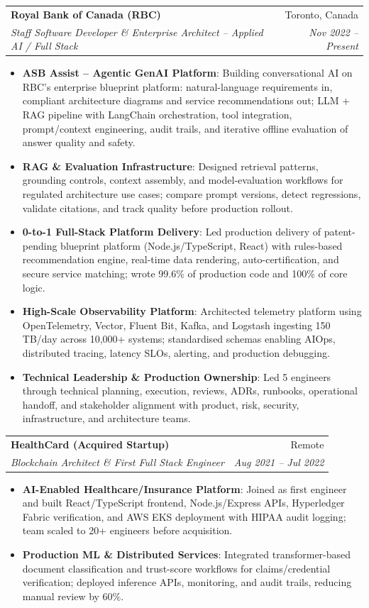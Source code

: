 \documentclass[letterpaper,9.5pt]{article}
\makeatletter
\newcommand{\resumeItem}[2]{\item\small{\textbf{#1}{: #2 \vspace{-2pt}}}}
\newcommand{\resumeSubheading}[4]{\vspace{-2pt}\item\begin{tabular*}{0.97\textwidth}{l@{\extracolsep{\fill}}r}\textbf{#1} & #2 \\\textit{\small#3} & \textit{\small #4} \\\end{tabular*}\vspace{-6pt}}
\newcommand{\resumeItemListStart}{\begin{itemize}}
\newcommand{\resumeItemListEnd}{\end{itemize}\vspace{-6pt}}
\makeatother
\begin{document}
  \resumeSubheading
    {Royal Bank of Canada (RBC)}{Toronto, Canada}
    {Staff Software Developer \& Enterprise Architect -- Applied AI / Full Stack}{Nov 2022 -- Present}
  \resumeItemListStart
    \resumeItem{ASB Assist -- Agentic GenAI Platform}
      {Building conversational AI on RBC's enterprise blueprint platform: natural-language requirements in, compliant architecture diagrams and service recommendations out; LLM + RAG pipeline with LangChain orchestration, tool integration, prompt/context engineering, audit trails, and iterative offline evaluation of answer quality and safety.}
    \resumeItem{RAG \& Evaluation Infrastructure}
      {Designed retrieval patterns, grounding controls, context assembly, and model-evaluation workflows for regulated architecture use cases; compare prompt versions, detect regressions, validate citations, and track quality before production rollout.}
    \resumeItem{0-to-1 Full-Stack Platform Delivery}
      {Led production delivery of patent-pending blueprint platform (Node.js/TypeScript, React) with rules-based recommendation engine, real-time data rendering, auto-certification, and secure service matching; wrote 99.6\% of production code and 100\% of core logic.}
    \resumeItem{High-Scale Observability Platform}
      {Architected telemetry platform using OpenTelemetry, Vector, Fluent Bit, Kafka, and Logstash ingesting 150\,TB/day across 10,000+ systems; standardised schemas enabling AIOps, distributed tracing, latency SLOs, alerting, and production debugging.}
    \resumeItem{Technical Leadership \& Production Ownership}
      {Led 5 engineers through technical planning, execution, reviews, ADRs, runbooks, operational handoff, and stakeholder alignment with product, risk, security, infrastructure, and architecture teams.}
  \resumeItemListEnd

  \resumeSubheading
    {HealthCard (Acquired Startup)}{Remote}
    {Blockchain Architect \& First Full Stack Engineer}{Aug 2021 -- Jul 2022}
  \resumeItemListStart
    \resumeItem{AI-Enabled Healthcare/Insurance Platform}
      {Joined as first engineer and built React/TypeScript frontend, Node.js/Express APIs, Hyperledger Fabric verification, and AWS EKS deployment with HIPAA audit logging; team scaled to 20+ engineers before acquisition.}
    \resumeItem{Production ML \& Distributed Services}
      {Integrated transformer-based document classification and trust-score workflows for claims/credential verification; deployed inference APIs, monitoring, and audit trails, reducing manual review by 60\%.}
  \resumeItemListEnd
\end{document}
